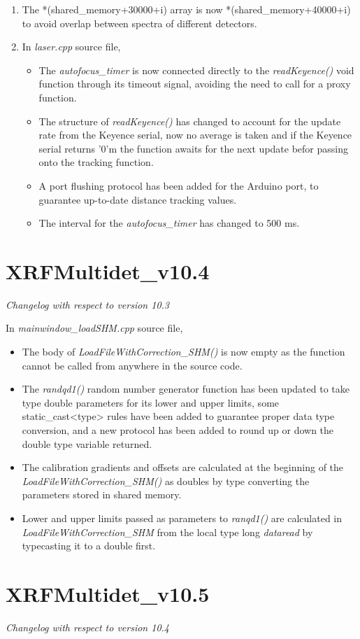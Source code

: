 \documentclass[a4paper,12pt]{article}
\begin{document}
\begin{enumerate}
	\item The *(shared\_memory+30000+i) array is now *(shared\_memory+40000+i) to avoid overlap between spectra of different detectors.
	\item In \textit{laser.cpp} source file,
	\begin{itemize}
		\item The \textit{autofocus\_timer} is now connected directly to the \textit{readKeyence()} void function through its timeout signal, avoiding the need to call for a proxy function.
		\item The structure of \textit{readKeyence()} has changed to account for the update rate from the Keyence serial, now no average is taken and if the Keyence serial returns '0'm the function awaits for the next update befor passing onto the tracking function.
		\item A port flushing protocol has been added for the Arduino port, to guarantee up-to-date distance tracking values.
		\item The interval for the \textit{autofocus\_timer} has changed to 500 ms.
	\end{itemize}
\end{enumerate}


\section{XRFMultidet\_v10.4}
\textit{Changelog with respect to version 10.3}

In \textit{mainwindow\_loadSHM.cpp} source file, 
\begin{itemize}
	\item{The body of \textit{LoadFileWithCorrection\_SHM()} is now empty as the function cannot be called from anywhere in the source code.}
	\item{The \textit{randqd1()} random number generator function has been updated to take type double parameters for its lower and upper limits, some static\_cast<type> rules have been added to guarantee proper data type conversion, and a new protocol has been added to round up or down the double type variable returned.}
	\item{The calibration gradients and offsets are calculated at the beginning of the \textit{LoadFileWithCorrection\_SHM()} as doubles by type converting the parameters stored in shared memory.} 
	\item{Lower and upper limits passed as parameters to \textit{ranqd1()} are calculated in \textit{LoadFileWithCorrection\_SHM} from the local type long \textit{dataread} by typecasting it to a double first.}
\end{itemize}


\section{XRFMultidet\_v10.5}
\textit{Changelog with respect to version 10.4}
\end{document}
